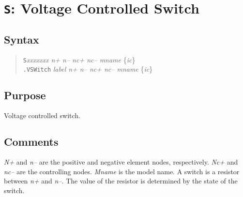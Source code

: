 %
%
%
%
\section{{\tt S}: Voltage Controlled Switch}
\subsection{Syntax}
\begin{verse}
{\tt S}{\it xxxxxxx n+ n-- nc+ nc-- mname} \{{\it ic}\}\\
{\tt .VSWitch} {\it label n+ n-- nc+ nc-- mname} \{{\it ic}\}
\end{verse}
\subsection{Purpose}

Voltage controlled switch.
\subsection{Comments}

{\it N+} and {\it n--} are the positive and negative element nodes,
respectively.  {\it Nc+} and {\it nc--} are the controlling nodes.
{\it Mname} is the model name.  A switch is a resistor between {\it
n+} and {\it n--}.  The value of the resistor is determined by the
state of the switch.

